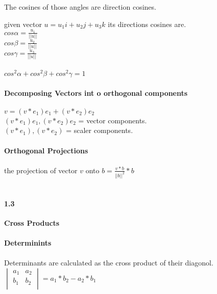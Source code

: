 \documentclass[14pt]{extreport}
\begin{document}
The cosines of those angles are direction cosines.

given vector $u = u_1i + u_2j + u_3k$ its directions cosines are.\\
$cos \alpha = \frac{u_1}{||u||}$\\

$cos \beta = \frac{u_2}{||u||}$\\

$cos \gamma = \frac{u_3}{||u||}$\\\\

$cos^2 \alpha + cos^2 \beta + cos^2 \gamma = 1$\\\\

\textbf{Decomposing Vectors int o orthogonal components}\\\\

$v = (v * e_1)e_1 + (v * e_2)e_2$\\

$(v * e_1)e_1, (v*e_2)e_2$ = vector components.\\

$(v * e_1), (v*e_2)$ = scaler components.\\\\


\textbf{Orthogonal Projections}\\\\

the projection of vector $v$ onto $b = \frac{v * b}{||b||^2}*b$\\\\


\paragraph{1.3}\textbf{Cross Products}\\\\

\textbf{Determinints}\\\\

Determinants are calculated as the cross product of their diagonol.\\

$\begin{vmatrix}
a_1 &  a_2\\
b_1 &  b_2 \\
\end{vmatrix} 
=
a_1 * b_2 - a_2 * b_1$\\\\
\end{document}
